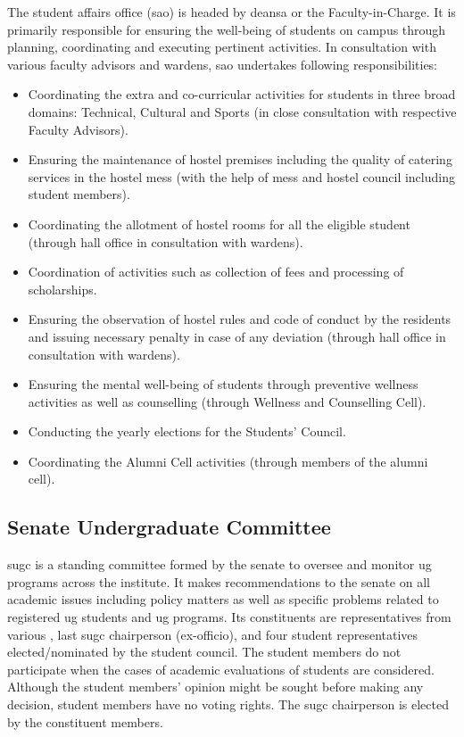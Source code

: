 The student affairs office (\acrshort{sao}) is headed by \acrfull{deansa} or the Faculty-in-Charge. It is primarily responsible for ensuring the well-being of students on campus through planning, coordinating and executing pertinent activities. In consultation with various faculty advisors and wardens, \acrshort{sao} undertakes following responsibilities:

\begin{itemize}[leftmargin=15mm]
	\item Coordinating the extra and co-curricular activities for students in three broad domains: Technical, Cultural and Sports (in close consultation with respective Faculty Advisors).
	\item Ensuring the maintenance of hostel premises including the quality of catering services in the hostel mess (with the help of mess and hostel council including student members).
	\item Coordinating the allotment of hostel rooms for all the eligible student (through hall office in consultation with wardens).
	\item Coordination of activities such as collection of fees and processing of scholarships.
	\item Ensuring the observation of hostel rules and code of conduct by the residents and issuing necessary penalty in case of any deviation (through hall office in consultation with wardens).
	\item Ensuring the mental well-being of students through preventive wellness activities as well as counselling (through Wellness and Counselling Cell).
	\item Conducting the yearly elections for the Students’ Council.
	\item Coordinating the Alumni Cell activities (through members of the alumni cell).
\end{itemize}

\subsection{Senate Undergraduate Committee}

\acrfull{sugc} is a standing committee formed by the senate to oversee and monitor \acrshort{ug} programs across the institute. It makes recommendations to the \gls{senate} on all academic issues including policy matters as well as specific problems related to registered \acrshort{ug} students and \acrshort{ug} programs. Its constituents are representatives from various , last \acrshort{sugc} chairperson (ex-officio), and four student representatives elected/nominated by the student council. The student members do not participate when the cases of academic evaluations of students are considered. Although the student members' opinion might be sought before making any decision, student members have no voting rights. The \acrshort{sugc} chairperson is elected by the constituent members. 

